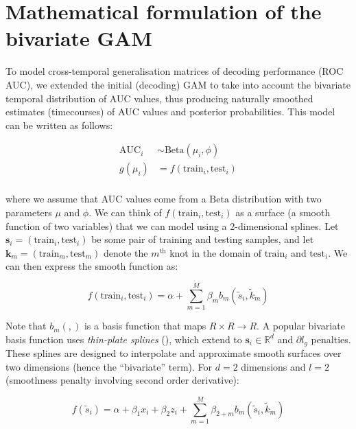 \documentclass[
  doc,
  floatsintext,
  longtable,
  a4paper,
  nolmodern,
  notxfonts,
  notimes,
  colorlinks=true,linkcolor=blue,citecolor=blue,urlcolor=blue]{apa7}
\begin{document}
\newpage

\section{Mathematical formulation of the bivariate
GAM}\label{mathematical-formulation-of-the-bivariate-gam}

To model cross-temporal generalisation matrices of decoding performance
(ROC AUC), we extended the initial (decoding) GAM to take into account
the bivariate temporal distribution of AUC values, thus producing
naturally smoothed estimates (timecourses) of AUC values and posterior
probabilities. This model can be written as follows:

\[
\begin{aligned}
\text{AUC}_{i} &\sim \mathrm{Beta}(\mu_{i}, \phi)\\
g(\mu_{i}) &= f \left(\text{train}_{i}, \text{test}_{i} \right)\\
\end{aligned}
\]

where we assume that AUC values come from a \(\mathrm{Beta}\)
distribution with two parameters \(\mu\) and \(\phi\). We can think of
\(f \left(\text{train}_{i}, \text{test}_{i} \right)\) as a surface (a
smooth function of two variables) that we can model using a
2-dimensional splines. Let
\(\mathbf{s}_{i} = \left(\text{train}_{i}, \text{test}_{i} \right)\) be
some pair of training and testing samples, and let
\(\mathbf{k}_{m} = \left(\text{train}_{m}, \text{test}_{m} \right)\)
denote the \(m^{\text{th}}\) knot in the domain of \(\text{train}_{i}\)
and \(\text{test}_{i}\). We can then express the smooth function as:

\[
f \left(\text{train}_{i}, \text{test}_{i} \right) = \alpha + \sum_{m=1}^M \beta_{m} b_{m} \left(\tilde{s}_{i}, \tilde{k}_{m} \right)
\]

Note that \(b_{m}(,)\) is a basis function that maps
\(R \times R \rightarrow R\). A popular bivariate basis function uses
\emph{thin-plate splines} (), which
extend to \(\mathbf{s}_{i} \in \mathbb{R}^{d}\) and \(\partial l_{g}\)
penalties. These splines are designed to interpolate and approximate
smooth surfaces over two dimensions (hence the ``bivariate'' term). For
\(d=2\) dimensions and \(l=2\) (smoothness penalty involving second
order derivative):

\[
f \left(\tilde{s}_{i} \right) = \alpha + \beta_{1} x_{i} + \beta_{2} z_{i} +\sum_{m=1}^{M} \beta_{2+m} b_m\left(\tilde{s}_i, \tilde{k}_m\right)
\]
\end{document}
